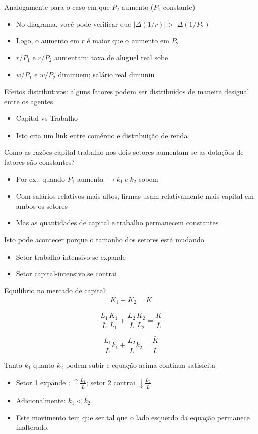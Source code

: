 \documentclass[a4paper,12pt]{article}[abntex2]
\begin{document}
Analogamente para o caso em que \(P_2\) aumento (\(P_1\) constante)\begin{itemize}
    \item No diagrama, você pode verificar que \(|\Delta(1/r)|>|\Delta(1/P_2)|\)
    \item Logo, o aumento em \(r\) é maior que o aumento em \(P_2\)
    \item \(r/P_1\) e \(r/P_2\) aumentam; taxa de aluguel real sobe
    \item \(w/P_1\) e \(w/P_2\) diminuem; salário real dimuniu
\end{itemize}

Efeitos distributivos: alguns fatores podem ser distribuídos de maneira desigual entre os agentes\begin{itemize}
    \item Capital vs Trabalho 
    \item Isto cria um link entre comércio e distribuição de renda
\end{itemize}

Como as razões capital-trabalho nos dois setores aumentam se as dotações de fatores são constantes?\begin{itemize}
    \item Por ex.: quando \(P_1\) aumenta \(\rightarrow k_1 \ e \ k_2 \) sobem 
    \item Com salários relativos mais altos, firmas usam relativamente mais capital em ambos os setores 
    \item Mas as quantidades de capital e trabalho permanecem constantes 
\end{itemize}

Isto pode acontecer porque o tamanho dos setores está mudando\begin{itemize}
    \item Setor trabalho-intensivo se expande
    \item Setor capital-intensivo se contrai
\end{itemize}

Equilíbrio no mercado de capital:
\[
K_1+K_2=\bar{K}
\]

\[
\frac{L_1}{\bar{L}}\frac{K_1}{L_1} + \frac{L_2}{\bar{L}}\frac{K_2}{L_2} =\frac{\bar{K}}{\bar{L}}
\]

\[
\frac{L_1}{\bar{L}}k_1+\frac{L_2}{\bar{L}}k_2=\frac{\bar{K}}{\bar{L}}
\]

Tanto \(k_1\) quanto \(k_2\) podem subir e equação acima continua satisfeita\begin{itemize}
    \item Setor 1 expande : \(\uparrow \frac{L_1}{\bar{L}}\); setor 2 contrai \(\downarrow \frac{L_2}{\bar{L}}\)
    \item Adicionalmente: \(k_1<k_2\)
    \item Este movimento tem que ser tal que o lado esquerdo da equação permanece inalterado.
\end{itemize}
\end{document}
